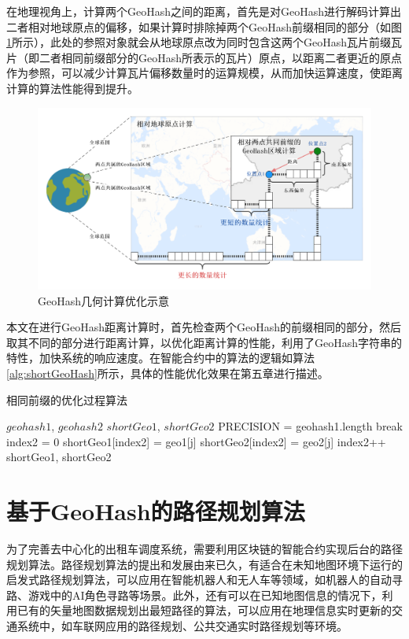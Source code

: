 在地理视角上，计算两个GeoHash之间的距离，首先是对GeoHash进行解码计算出二者相对地球原点的偏移，如果计算时排除掉两个GeoHash前缀相同的部分（如图\ref{fig:calBetter}所示），此处的参照对象就会从地球原点改为同时包含这两个GeoHash瓦片前缀瓦片（即二者相同前缀部分的GeoHash所表示的瓦片）原点，以距离二者更近的原点作为参照，可以减少计算瓦片偏移数量时的运算规模，从而加快运算速度，使距离计算的算法性能得到提升。

\begin{figure}[h]
  \centering
  \includegraphics[width=1.0\textwidth]{figures/GeoHash计算优化}
  \caption{GeoHash几何计算优化示意}\label{fig:calBetter}
\end{figure}

本文在进行GeoHash距离计算时，首先检查两个GeoHash的前缀相同的部分，然后取其不同的部分进行距离计算，以优化距离计算的性能，利用了GeoHash字符串的特性，加快系统的响应速度。在智能合约中的算法的逻辑如算法\ref{alg:shortGeoHash}所示，具体的性能优化效果在第五章进行描述。

\begin{algorithm}[h]
  \caption{相同前缀的优化过程算法}
  \label{alg:shortGeoHash}
  \begin{algorithmic}[1]
  \REQUIRE $geohash1$, $geohash2$
  \ENSURE $shortGeo1$, $shortGeo2$
  \STATE PRECISION = geohash1.length
      \STATE break
    \ENDIF
  \ENDFOR
  \STATE index2 = 0
    \STATE shortGeo1[index2] = geo1[j]
    \STATE shortGeo2[index2] = geo2[j]
    \STATE index2++
  \ENDFOR
  \RETURN shortGeo1, shortGeo2
  \end{algorithmic}
\end{algorithm}

\section{基于GeoHash的路径规划算法}
为了完善去中心化的出租车调度系统，需要利用区块链的智能合约实现后台的路径规划算法。路径规划算法的提出和发展由来已久，有适合在未知地图环境下运行的启发式路径规划算法，可以应用在智能机器人和无人车等领域，如机器人的自动寻路、游戏中的AI角色寻路等场景。此外，还有可以在已知地图信息的情况下，利用已有的矢量地图数据规划出最短路径的算法，可以应用在地理信息实时更新的交通系统中，如车联网应用的路径规划、公共交通实时路径规划等环境。

